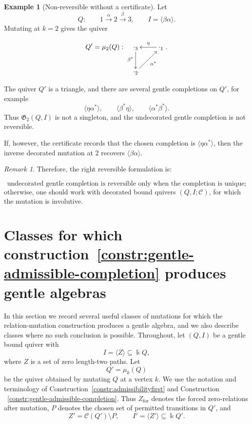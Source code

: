 \documentclass[11pt]{article}
\newcommand{\K}{\Bbbk}
\theoremstyle{plain}
\theoremstyle{definition}
\newtheorem{example}[theorem]{Example}
\theoremstyle{remark}
\newtheorem{remark}[theorem]{Remark}
\begin{document}
\begin{example}[Non-reversible without a certificate]
Let
\[
Q:\qquad 1\xrightarrow{\alpha}2\xrightarrow{\beta}3,
\qquad
I=\langle \beta\alpha\rangle.
\]
Mutating at \(k=2\) gives the quiver

\begin{equation}\label{}
\nonumber Q'=\mu_2(Q):  \xymatrix{
\cdot_{3} \ar[d]_{\beta^*} & \ar[l]_{\eta}\cdot_{1} \\
	\cdot_{2}  \ar[ur]_{\alpha^*}}.
  \end{equation}


The quiver \(Q'\) is a triangle, and there are several gentle completions on
\(Q'\), for example
\[
\langle \eta\alpha^*\rangle,\qquad
\langle \beta^*\eta\rangle,\qquad
\langle \alpha^*\beta^*\rangle.
\]
Thus \(\mathfrak G_2(Q,I)\) is not a singleton, and the undecorated gentle
completion is not reversible.

If, however, the certificate records that the chosen completion is
\(\langle \eta\alpha^*\rangle\), then the inverse decorated mutation at \(2\)
recovers \(\langle \beta\alpha\rangle\).
\end{example}

\begin{remark}
Therefore, the right reversible formulation is:

\[
\text{undecorated gentle completion is reversible only when the completion is unique;}
\]
otherwise, one should work with decorated bound quivers
\((Q,I;\mathcal C)\), for which the mutation is involutive.
\end{remark}

\section{Classes for which construction~\ref{constr:gentle-admissible-completion} produces gentle algebras}
\label{sec:classes-gentle-relation-mutation}

In this section we record several useful classes of mutations for which the
relation-mutation construction produces a gentle algebra, and we also describe
classes where no such conclusion is possible.  Throughout, let
\((Q,I)\) be a gentle bound quiver with
\[
  I=\langle Z\rangle \subseteq \K Q,
\]
where \(Z\) is a set of zero length-two paths.  Let
\[
  Q'=\mu_k(Q)
\]
be the quiver obtained by mutating \(Q\) at a vertex \(k\).  We use the
notation and terminology of Construction~\ref{constr:admissibilityfirst} and
Construction ~\ref{constr:gentle-admissible-completion}.  Thus
\(Z_{\mathrm{for}}\) denotes the forced zero-relations after mutation,
\(P\) denotes the chosen set of permitted transitions in \(Q'\), and
\[
  Z'=\mathcal C(Q')\setminus P,
  \qquad
  I'=\langle Z'\rangle\subseteq \K Q'.
\]
\end{document}
